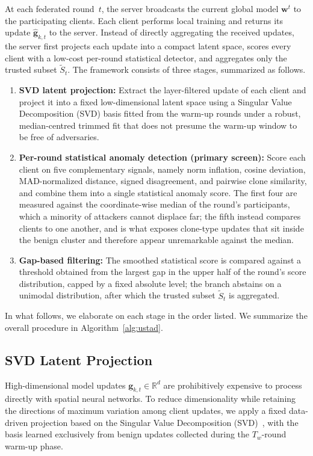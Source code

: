\documentclass[journal]{IEEEtran}
\begin{document}
At each federated round~$t$, the server broadcasts the current global model $\mathbf{w}^t$ to the participating clients. Each client performs local training and returns its update $\hat{\mathbf{g}}_{k,t}$ to the server. Instead of directly aggregating the received updates, the server first projects each update into a compact latent space, scores every client with a low-cost per-round statistical detector, and aggregates only the trusted subset $\widetilde{S}_t$. The framework consists of three stages, summarized as follows.
\begin{enumerate}
    \item \textbf{SVD latent projection:} Extract the layer-filtered update of each client and project it into a fixed low-dimensional latent space using a Singular Value Decomposition (SVD) basis fitted from the warm-up rounds under a robust, median-centred trimmed fit that does not presume the warm-up window to be free of adversaries.
    \item \textbf{Per-round statistical anomaly detection (primary screen):} Score each client on five complementary signals, namely norm inflation, cosine deviation, MAD-normalized distance, signed disagreement, and pairwise clone similarity, and combine them into a single statistical anomaly score. The first four are measured against the coordinate-wise median of the round's participants, which a minority of attackers cannot displace far; the fifth instead compares clients to one another, and is what exposes clone-type updates that sit inside the benign cluster and therefore appear unremarkable against the median.
    \item \textbf{Gap-based filtering:} The smoothed statistical score is compared against a threshold obtained from the largest gap in the upper half of the round's score distribution, capped by a fixed absolute level; the branch abstains on a unimodal distribution, after which the trusted subset $\widetilde{S}_t$ is aggregated.
\end{enumerate}

In what follows, we elaborate on each stage in the order listed. We summarize the overall procedure in Algorithm~\ref{alg:ustad}.

\subsection{SVD Latent Projection}
\label{sec:svd_projection}

High-dimensional model updates $\mathbf{g}_{k,t} \in \mathbb{R}^d$ are prohibitively expensive to process directly with spatial neural networks. To reduce dimensionality while retaining the directions of maximum variation among client updates, we apply a fixed data-driven projection based on the Singular Value Decomposition (SVD)~\cite{zhang2015singular}, with the basis learned exclusively from benign updates collected during the $T_w$-round warm-up phase.
\end{document}
